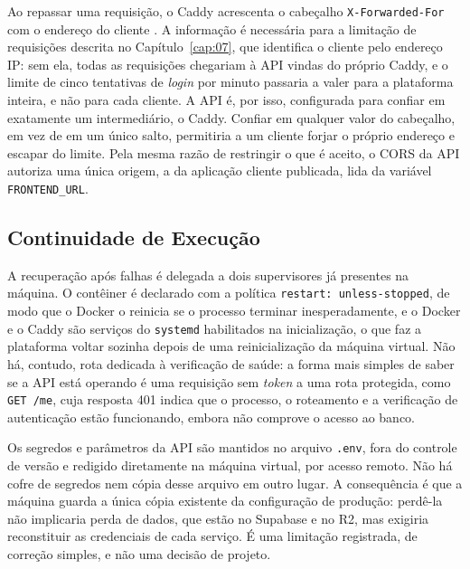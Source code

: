 Ao repassar uma requisição, o Caddy acrescenta o cabeçalho \texttt{X-Forwarded-For} com o endereço do cliente \cite{caddy2026proxy}. A informação é necessária para a limitação de requisições descrita no Capítulo~\ref{cap:07}, que identifica o cliente pelo endereço IP: sem ela, todas as requisições chegariam à API vindas do próprio Caddy, e o limite de cinco tentativas de \textit{login} por minuto passaria a valer para a plataforma inteira, e não para cada cliente. A API é, por isso, configurada para confiar em exatamente um intermediário, o Caddy. Confiar em qualquer valor do cabeçalho, em vez de em um único salto, permitiria a um cliente forjar o próprio endereço e escapar do limite. Pela mesma razão de restringir o que é aceito, o CORS da API autoriza uma única origem, a da aplicação cliente publicada, lida da variável \texttt{FRONTEND\_URL}.

\subsection{Continuidade de Execução}

A recuperação após falhas é delegada a dois supervisores já presentes na máquina. O contêiner é declarado com a política \texttt{restart: unless-stopped}, de modo que o Docker o reinicia se o processo terminar inesperadamente, e o Docker e o Caddy são serviços do \texttt{systemd} habilitados na inicialização, o que faz a plataforma voltar sozinha depois de uma reinicialização da máquina virtual. Não há, contudo, rota dedicada à verificação de saúde: a forma mais simples de saber se a API está operando é uma requisição sem \textit{token} a uma rota protegida, como \texttt{GET /me}, cuja resposta 401 indica que o processo, o roteamento e a verificação de autenticação estão funcionando, embora não comprove o acesso ao banco.

Os segredos e parâmetros da API são mantidos no arquivo \texttt{.env}, fora do controle de versão e redigido diretamente na máquina virtual, por acesso remoto. Não há cofre de segredos nem cópia desse arquivo em outro lugar. A consequência é que a máquina guarda a única cópia existente da configuração de produção: perdê-la não implicaria perda de dados, que estão no Supabase e no R2, mas exigiria reconstituir as credenciais de cada serviço. É uma limitação registrada, de correção simples, e não uma decisão de projeto.

